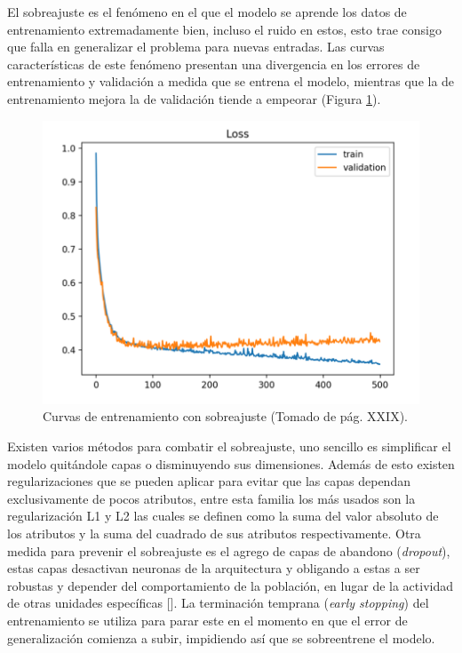 El sobreajuste es el fenómeno en el que el modelo se aprende los datos de entrenamiento extremadamente bien, incluso
el ruido en estos, esto trae consigo que falla en generalizar el problema para nuevas entradas. Las curvas 
características de este fenómeno presentan una divergencia en los errores de entrenamiento y validación a medida
que se entrena el modelo, mientras que la de entrenamiento mejora la de validación tiende a empeorar (Figura \ref{fig:overfit}). 

\begin{figure}[h!]
	\begin{center}
		\begin{center}
			\includegraphics[scale=.3]{Graphics/overfit_raising_val_error.png}
        \end{center}
	    \caption{Curvas de entrenamiento con sobreajuste (Tomado de \cite{brownlee2018better} pág. XXIX).}\label{fig:overfit}
	\end{center}
\end{figure}

Existen varios métodos para combatir el sobreajuste, uno sencillo es simplificar el modelo quitándole capas 
o disminuyendo sus dimensiones. Además de esto existen regularizaciones que se pueden aplicar para evitar que 
las capas dependan exclusivamente de pocos atributos, entre esta familia los más usados son la regularización
L1 y L2 las cuales se definen como la suma del valor absoluto de los atributos y la suma del cuadrado de sus 
atributos respectivamente. Otra medida para prevenir el sobreajuste es el agrego de capas de abandono 
(\emph{dropout}), estas capas desactivan neuronas de la arquitectura y obligando a 
estas a ser robustas y depender del comportamiento de la población, en lugar de la actividad de otras unidades 
específicas [\cite{baldi2013dropout}]. La terminación temprana (\emph{early stopping}) del entrenamiento
se utiliza para parar este en el momento en que el error de generalización comienza a subir, impidiendo así que 
se sobreentrene el modelo.

